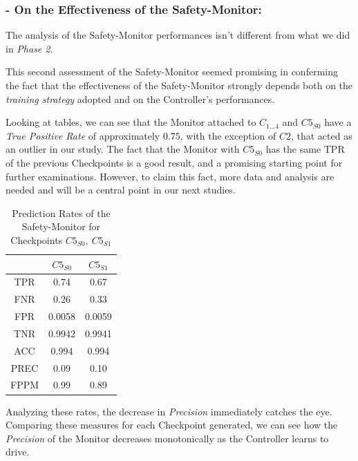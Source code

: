 \subsubsection{- On the Effectiveness of the Safety-Monitor:}

The analysis of the Safety-Monitor performances isn't different from what we did in \textsl{Phase 2}.

This second assessment of the Safety-Monitor seemed promising in conferming the fact that the effectiveness of the Safety-Monitor strongly depends both on the \textsl{training strategy} adopted and on the Controller's performances.

Looking at tables, we can see that the Monitor attached to $C_{1\dots 4}$ and $C5_{S0}$ have a \textsl{True Positive Rate} of approximately $0.75$, with the exception of $C2$, that acted as an outlier in our study. The fact that the Monitor with $C5_{S0}$ has the same TPR of the previous Checkpoints is a good result, and a promising starting point for further examinations. However, to claim this fact, more data and analysis are needed and will be a central point in our next studies.\newline

\begin{table}[h]
	\begin{center}
		\begin{tabular}{ |c|c|c| }
			\hline
			& $C5_{S0}$ & $C5_{S1}$ \\
			\hline
			TPR & 0.74 & 0.67 \\
			\hline
			FNR & 0.26 & 0.33 \\
			\hline
			FPR & 0.0058 & 0.0059 \\
			\hline
			TNR & 0.9942 & 0.9941 \\
			\hline
			ACC & 0.994 & 0.994 \\
			\hline
			PREC & 0.09 & 0.10 \\
			\hline
			FPPM & 0.99 & 0.89 \\
			\hline
		\end{tabular}
		\caption{Prediction Rates of the Safety-Monitor for Checkpoints $C5_{S0},\: C5_{S1}$}
	\end{center}
\end{table}

Analyzing these rates, the decrease in \textsl{Precision} immediately catches the eye. Comparing these measures for each Checkpoint generated, we can see how the \textsl{Precision} of the Monitor decreases monotonically as the Controller learns to drive.


